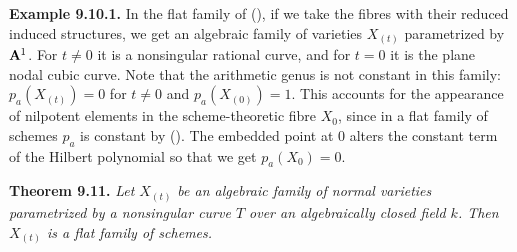 {\medskip
\noindent\hypertarget{result-III-9.10.1}{}\textbf{Example 9.10.1.} In the flat family of (), if we take the fibres with their reduced induced structures, we get an algebraic family of varieties $X_{(t)}$ parametrized by $\AffSpace{1}$. For $t\ne0$ it is a nonsingular rational curve, and for $t=0$ it is the plane nodal cubic curve. Note that the arithmetic genus is not constant in this family: $p_a(X_{(t)})=0$ for $t\ne0$ and $p_a(X_{(0)})=1$. This accounts for the appearance of nilpotent elements in the scheme-theoretic fibre $X_0$, since in a flat family of schemes $p_a$ is constant by (). The embedded point at $0$ alters the constant term of the Hilbert polynomial so that we get $p_a(X_0)=0$.

\medskip
\noindent\hypertarget{result-III-9.11}{}\textbf{Theorem 9.11.} \emph{Let $X_{(t)}$ be an algebraic family of normal varieties parametrized by a nonsingular curve $T$ over an algebraically closed field $k$. Then $X_{(t)}$ is a flat family of schemes.}}
